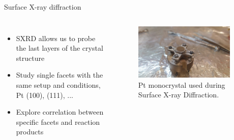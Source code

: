 \begin{frame}{Surface X-ray diffraction}
    \begin{columns}
        \centering
        \begin{itemize}
            \item SXRD allows us to probe the last layers of the crystal structure
            \vspace{0.5cm}
            \pause
            \item Study \textcolor{Important}{single facets} with the same setup and conditions, Pt (100), (111), ...
            \vspace{0.5cm}
            \pause
            \item \textcolor{Important}{Explore correlation between specific facets and reaction products}
        \end{itemize}

        \centering
        \pause
        \begin{figure}
            \centering
            \includegraphics[width=0.9\textwidth, trim={3.5cm 3.5cm 5cm 3.5cm}, clip]{Figures/sxrd_data/sample_sxrd.jpg}
            \caption{Pt monocrystal used during Surface X-ray Diffraction.}
            \label{fig:my_label}
        \end{figure}



\end{columns}
\end{frame}

